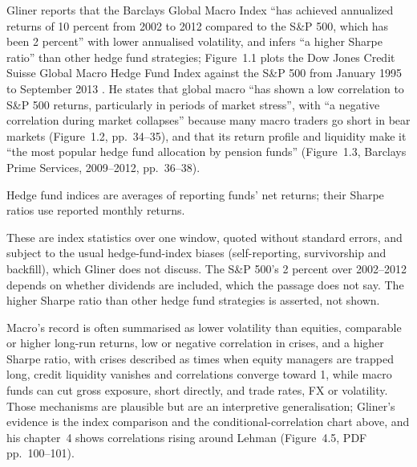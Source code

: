 \begin{qfevidence}\label{ev:global-macro-crisis-performance}
 Gliner reports that the Barclays Global Macro Index ``has achieved annualized returns of 10 percent from 2002 to 2012 compared to the S\&P 500, which has been 2 percent'' with lower annualised volatility, and infers ``a higher Sharpe ratio'' than other hedge fund strategies; Figure~1.1 plots the Dow Jones Credit Suisse Global Macro Hedge Fund Index against the S\&P 500 from January 1995 to September 2013 \citep[chap.~1, sec.\ ``Return Profile and Allocations'', PDF p.~34]{s7-gliner}. He states that global macro ``has shown a low correlation to S\&P 500 returns, particularly in periods of market stress'', with ``a negative correlation during market collapses'' because many macro traders go short in bear markets (Figure~1.2, pp.~34--35), and that its return profile and liquidity make it ``the most popular hedge fund allocation by pension funds'' (Figure~1.3, Barclays Prime Services, 2009--2012, pp.~36--38).

 Hedge fund indices are averages of reporting funds' net returns; their Sharpe ratios use reported monthly returns.

 These are index statistics over one window, quoted without standard errors, and subject to the usual hedge-fund-index biases (self-reporting, survivorship and backfill), which Gliner does not discuss. The S\&P 500's 2 percent over 2002--2012 depends on whether dividends are included, which the passage does not say. The higher Sharpe ratio than other hedge fund strategies is asserted, not shown.

 Macro's record is often summarised as lower volatility than equities, comparable or higher long-run returns, low or negative correlation in crises, and a higher Sharpe ratio, with crises described as times when equity managers are trapped long, credit liquidity vanishes and correlations converge toward 1, while macro funds can cut gross exposure, short directly, and trade rates, FX or volatility. Those mechanisms are plausible but are an interpretive generalisation; Gliner's evidence is the index comparison and the conditional-correlation chart above, and his chapter~4 shows correlations rising around Lehman (Figure~4.5, PDF pp.~100--101).


\end{qfevidence}
